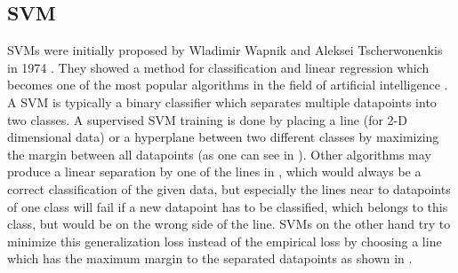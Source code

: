\subsection{\acf*{SVM}}
\label{sec:svm}

\acfp{SVM} were initially proposed by Wladimir Wapnik and Aleksei Tscherwonenkis in 1974 \cite{vapnik1974theory}. They showed a method for classification and linear regression which becomes one of the most popular algorithms in the field of artificial intelligence \cite{russellnorvig-ai}. A \ac{SVM} is typically a binary classifier which separates multiple datapoints into two classes. A supervised \ac{SVM} training is done by placing a line (for 2-D dimensional data) or a hyperplane between two different classes by maximizing the margin between all datapoints (as one can see in ). Other algorithms may produce a linear separation by one of the lines in , which would always be a correct classification of the given data, but especially the lines near to datapoints of one class will fail if a new datapoint has to be classified, which belongs to this class, but would be on the wrong side of the line. \acp{SVM} on the other hand try to minimize this generalization loss instead of the empirical loss by choosing a line which has the maximum margin to the separated datapoints as shown in .

